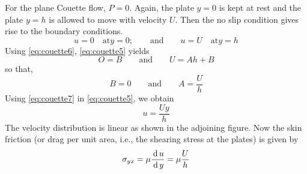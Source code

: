 \documentclass[../main-sheet.tex]{subfiles}
\begin{document}
\begin{soln}
For the plane Couette flow, \(P = 0\). Again, the plate \(y = 0\) is kept at rest and the plate \(y = h\) is allowed to move with velocity \(U\). Then the no slip condition gives rise to the boundary conditions.
\begin{equation}
    u=0\quad\text{at} y=0;\qquad \text{and}\qquad u=U\quad\text{at}y=h\label{eq:couette6}
\end{equation}
Using \eqref{eq:couette6}, \eqref{eq:couette5} yields
\[O=B\qquad\text{and}\qquad U=Ah+B\]
so that,
\begin{equation}
    B=0\qquad\text{and}\qquad A=\frac{U }{h}\label{eq:couette7}
\end{equation}
Using \eqref{eq:couette7} in \eqref{eq:couette5}, we obtain
\[u = \frac{Uy}{h}\]
The velocity distribution is linear as shown in the adjoining figure. Now the skin friction (or drag per unit area, i.e., the shearing stress at the plates) is given by
\[
    \sigma_{yx } =\mu\frac{\,\mathrm{d}\, u }{\,\mathrm{d}\, y}=\mu \frac{U }{h}
\]
\end{soln}
\end{document}
